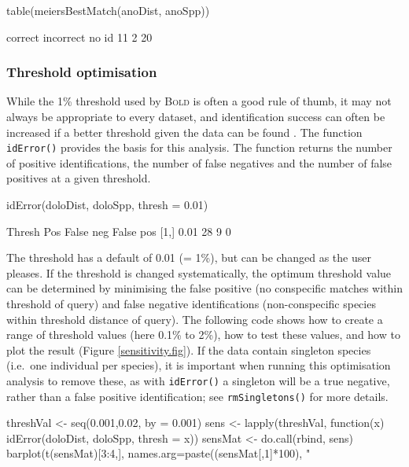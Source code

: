 \documentclass{article}
\newcommand{\progname}[1]{\textsc{#1}}
\newcommand{\fun}[1]{\texttt{#1}}
\begin{document}
\begin{console}
table(meiersBestMatch(anoDist, anoSpp))
\end{console}

\begin{Routput}
  correct incorrect     no id 
       11         2        20 
\end{Routput}


\subsubsection{Threshold optimisation} %
While the 1\% threshold used by \progname{Bold} is often a good rule of thumb, it may not always be appropriate to every dataset, and identification success can often be increased if a better threshold given the data can be found  \citep{Meye.Paul.2005}.  The function \fun{idError()} provides the basis for this analysis. The function returns the number of positive identifications, the number of false negatives and the number of false positives at a given threshold. 

\begin{console}
idError(doloDist, doloSpp, thresh = 0.01)
\end{console}

\begin{Routput}
     Thresh Pos False neg False pos
[1,]   0.01  28         9         0
\end{Routput}

The threshold has a default of 0.01 (= 1\%), but can be changed as the user pleases. If the threshold is changed systematically, the optimum threshold value can be determined by minimising the false positive (no conspecific matches within threshold of query) and false negative identifications (non-conspecific species within threshold distance of query). The following code shows how to create a range of threshold values (here 0.1\% to 2\%), how to test these values, and how to plot the result (Figure \ref{sensitivity.fig}). If the data contain singleton species (i.e.\ one individual per species), it is important when running this optimisation analysis to remove these, as with \fun{idError()} a singleton will be a true negative, rather than a false positive identification; see \fun{rmSingletons()} for more details.

\begin{console}
threshVal <- seq(0.001,0.02, by = 0.001)
sens <- lapply(threshVal, function(x) idError(doloDist, doloSpp, thresh = x))
sensMat <- do.call(rbind, sens)
barplot(t(sensMat)[3:4,], names.arg=paste((sensMat[,1]*100), "%
\end{console}
\end{document}
